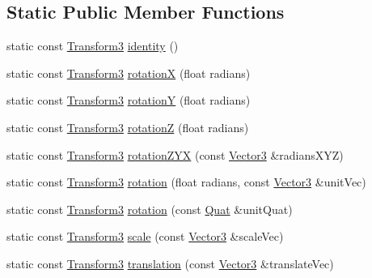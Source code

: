 \subsection*{Static Public Member Functions}
\begin{DoxyCompactItemize}
\item 
static const \hyperlink{classVectormath_1_1Aos_1_1Transform3}{Transform3} \hyperlink{classVectormath_1_1Aos_1_1Transform3_a206174e7a6c82fcd3a3be3c2eaa1c4c8}{identity} ()
\item 
static const \hyperlink{classVectormath_1_1Aos_1_1Transform3}{Transform3} \hyperlink{classVectormath_1_1Aos_1_1Transform3_a0789b73803fc9af8a408728026ea1547}{rotation\-X} (float radians)
\item 
static const \hyperlink{classVectormath_1_1Aos_1_1Transform3}{Transform3} \hyperlink{classVectormath_1_1Aos_1_1Transform3_ad8adbbcbbcfb9000f9f71d39e51f9422}{rotation\-Y} (float radians)
\item 
static const \hyperlink{classVectormath_1_1Aos_1_1Transform3}{Transform3} \hyperlink{classVectormath_1_1Aos_1_1Transform3_a88063872802cd561b7c692784b8c0341}{rotation\-Z} (float radians)
\item 
static const \hyperlink{classVectormath_1_1Aos_1_1Transform3}{Transform3} \hyperlink{classVectormath_1_1Aos_1_1Transform3_aee405eb7dc13075bbeac943259aa950d}{rotation\-Z\-Y\-X} (const \hyperlink{classVectormath_1_1Aos_1_1Vector3}{Vector3} \&radians\-X\-Y\-Z)
\item 
static const \hyperlink{classVectormath_1_1Aos_1_1Transform3}{Transform3} \hyperlink{classVectormath_1_1Aos_1_1Transform3_a56e3588c1c10d375515d00e4479369a7}{rotation} (float radians, const \hyperlink{classVectormath_1_1Aos_1_1Vector3}{Vector3} \&unit\-Vec)
\item 
static const \hyperlink{classVectormath_1_1Aos_1_1Transform3}{Transform3} \hyperlink{classVectormath_1_1Aos_1_1Transform3_afdcea7a2ac0c81a95c3e3bacecd635ad}{rotation} (const \hyperlink{classVectormath_1_1Aos_1_1Quat}{Quat} \&unit\-Quat)
\item 
static const \hyperlink{classVectormath_1_1Aos_1_1Transform3}{Transform3} \hyperlink{classVectormath_1_1Aos_1_1Transform3_a3a85d536b4e3a335d75a1e5cef98f0f5}{scale} (const \hyperlink{classVectormath_1_1Aos_1_1Vector3}{Vector3} \&scale\-Vec)
\item 
static const \hyperlink{classVectormath_1_1Aos_1_1Transform3}{Transform3} \hyperlink{classVectormath_1_1Aos_1_1Transform3_aae2d74bd8a2609917fdfc6fd8913413c}{translation} (const \hyperlink{classVectormath_1_1Aos_1_1Vector3}{Vector3} \&translate\-Vec)
\end{DoxyCompactItemize}



